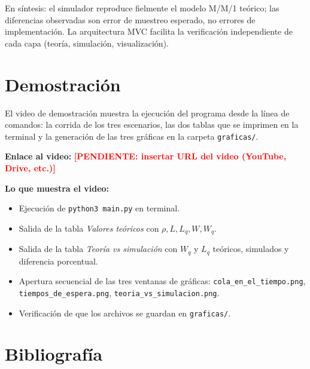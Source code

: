\documentclass[11pt,a4paper]{article}
\newcommand{\pendiente}[1]{\textcolor{red}{\textbf{[PENDIENTE: #1]}}}
\begin{document}
En síntesis: el simulador reproduce fielmente el modelo M/M/1 teórico; las
diferencias observadas son error de muestreo esperado, no errores de
implementación. La arquitectura MVC facilita la verificación independiente de
cada capa (teoría, simulación, visualización).

\section{Demostración}

El video de demostración muestra la ejecución del programa desde la línea de
comandos: la corrida de los tres escenarios, las dos tablas que se imprimen en la
terminal y la generación de las tres gráficas en la carpeta \texttt{graficas/}.

\noindent\textbf{Enlace al video:} \pendiente{insertar URL del video (YouTube, Drive, etc.)}

\noindent\textbf{Lo que muestra el video:}
\begin{itemize}
    \item Ejecución de \texttt{python3 main.py} en terminal.
    \item Salida de la tabla \emph{Valores teóricos} con $\rho, L, L_q, W, W_q$.
    \item Salida de la tabla \emph{Teoría vs simulación} con $W_q$ y $L_q$ teóricos,
          simulados y diferencia porcentual.
    \item Apertura secuencial de las tres ventanas de gráficas:
          \texttt{cola_en_el_tiempo.png}, \texttt{tiempos_de_espera.png},
          \texttt{teoria_vs_simulacion.png}.
    \item Verificación de que los archivos se guardan en \texttt{graficas/}.
\end{itemize}

\section{Bibliografía}

\nocite{*}


\end{document}
